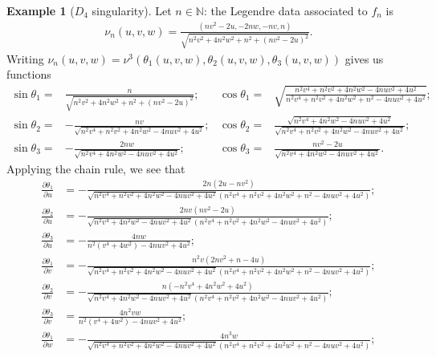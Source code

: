 \documentclass{amsart}
\theoremstyle{definition}
\theoremstyle{definition}
\newtheorem{example}{Example}
\theoremstyle{definition}
\newcommand{\mb}{\mathbb}
\begin{document}
{\begin{example}[$D_4$ singularity]
Let $n \in \mb{N}$: the Legendre data associated to $f_n$ is
\begin{align*}
	\nu_n(u,v,w)=\frac{(nv^2-2u,-2nw, -nv,n)}{\sqrt{n^2 v^2+4 n^2 w^2+n^2+\left(n v^2-2 u\right)^2}}.
\end{align*}
Writing $\nu_n(u,v,w)=\nu^3(\theta_1(u,v,w),\theta_2(u,v,w),\theta_3(u,v,w))$ gives us functions
\begin{align*}
	\sin \theta_1=	&\frac{n}{\sqrt{n^2 v^2+4 n^2 w^2+n^2+\left(n v^2-2 u\right)^2}}; &
	\cos \theta_1=	&\sqrt{\frac{n^2 v^4+n^2 v^2+4 n^2 w^2-4 n u v^2+4 u^2}{n^2 v^4+n^2 v^2+4 n^2 w^2+n^2-4 n u v^2+4 u^2}};\\
	\sin \theta_2=	&-\frac{n v}{\sqrt{n^2 v^4+n^2 v^2+4 n^2 w^2-4 n u v^2+4 u^2}};&
	\cos \theta_2=	&\frac{\sqrt{n^2 v^4+4 n^2 w^2-4 n u v^2+4 u^2}}{\sqrt{n^2 v^4+n^2 v^2+4 n^2 w^2-4 n u v^2+4 u^2}};\\
	\sin \theta_3=	&-\frac{2 n w}{\sqrt{n^2 v^4+4 n^2 w^2-4 n u v^2+4 u^2}};&
	\cos \theta_3=	&\frac{n v^2-2 u}{\sqrt{n^2 v^4+4 n^2 w^2-4 n u v^2+4 u^2}}.
\end{align*}
Applying the chain rule, we see that
\begin{align*}
	\frac{\partial \theta_1}{\partial u}&=-\frac{2 n \left(2 u-n v^2\right)}{\sqrt{n^2 v^4+n^2 v^2+4 n^2 w^2-4 n u v^2+4 u^2} \left(n^2 v^4+n^2 v^2+4 n^2 w^2+n^2-4 n u v^2+4 u^2\right)};
	\\
	\frac{\partial \theta_2}{\partial u}&=-\frac{2 n v \left(n v^2-2 u\right)}{\sqrt{n^2 v^4+4 n^2 w^2-4 n u v^2+4 u^2} \left(n^2 v^4+n^2 v^2+4 n^2 w^2-4 n u v^2+4 u^2\right)};
	\\
	\frac{\partial \theta_3}{\partial u}&=-\frac{4 n w}{n^2 \left(v^4+4 w^2\right)-4 n u v^2+4 u^2};
	\\
	\frac{\partial \theta_1}{\partial v}&=-\frac{n^2 v \left(2 n v^2+n-4 u\right)}{\sqrt{n^2 v^4+n^2 v^2+4 n^2 w^2-4 n u v^2+4 u^2} \left(n^2 v^4+n^2 v^2+4 n^2 w^2+n^2-4 n u v^2+4 u^2\right)};
	\\
	\frac{\partial \theta_2}{\partial v}&=-\frac{n \left(-n^2 v^4+4 n^2 w^2+4 u^2\right)}{\sqrt{n^2 v^4+4 n^2 w^2-4 n u v^2+4 u^2} \left(n^2 v^4+n^2 v^2+4 n^2 w^2-4 n u v^2+4 u^2\right)};
	\\
	\frac{\partial \theta_3}{\partial v}&=\frac{4 n^2 v w}{n^2 \left(v^4+4 w^2\right)-4 n u v^2+4 u^2};
	\\
	\frac{\partial \theta_1}{\partial w}&=-\frac{4 n^3 w}{\sqrt{n^2 v^4+n^2 v^2+4 n^2 w^2-4 n u v^2+4 u^2} \left(n^2 v^4+n^2 v^2+4 n^2 w^2+n^2-4 n u v^2+4 u^2\right)};
	\\

\end{align*}
\end{example}}
\end{document}
